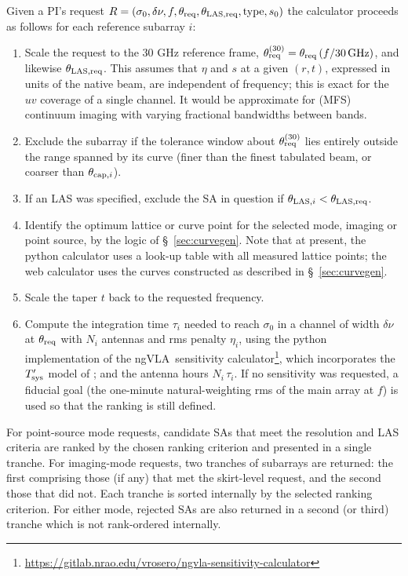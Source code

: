 \documentclass[11pt]{article}
\newcommand{\ngvla}{ngVLA}
\begin{document}
Given a PI's request $R = (\sigma_0, \delta\nu, f, \theta_{\rm req},
\theta_{\rm LAS,req}, {\rm type}, s_0)$ the calculator proceeds as
follows for each reference subarray $i$:
\begin{enumerate}
\item Scale the request to the 30 GHz reference frame, $\theta_{\rm
  req}^{(30)} = \theta_{\rm req}\,(f/30\,{\rm GHz})$, and likewise
  $\theta_{\rm LAS,req}$.  This assumes that $\eta$ and $s$ at a given
  $(r,t)$, expressed in units of the native beam, are independent of
  frequency; this is exact for the $uv$ coverage of a single channel.
  It would be approximate for (MFS) continuum imaging with varying
  fractional bandwidths between bands.
\item Exclude the subarray if the tolerance window about
  $\theta_{\rm req}^{(30)}$ lies entirely outside the range spanned by
  its curve (finer than the finest tabulated beam, or coarser than
  $\theta_{{\rm cap},i}$).
\item If an LAS was specified, exclude the SA in question if
  $\theta_{{\rm  LAS},i} < \theta_{\rm LAS,req}$.
\item Identify the optimum lattice or curve point for the selected
  mode, imaging or point source, by the logic of \S~\ref{sec:curvegen}.
  Note that at present, the python calculator uses a look-up table
  with all measured lattice points; the web calculator uses the
  curves constructed as described in \S~\ref{sec:curvegen}.
\item Scale the taper $t$ back to the requested frequency.
\item Compute the integration time $\tau_i$ needed to reach $\sigma_0$
  in a channel of width $\delta\nu$ at $\theta_{\rm req}$ with $N_i$
  antennas and rms penalty $\eta_i$, using the python implementation
  of the \ngvla\ sensitivity
  calculator\footnote{\url{https://gitlab.nrao.edu/vrosero/ngvla-sensitivity-calculator}},
  which incorporates the $T'_{\rm sys}$ model of \citep{memo96}; and
  the antenna hours $N_i\,\tau_i$.  If no sensitivity was requested, a
  fiducial goal (the one-minute natural-weighting rms of the main
  array at $f$) is used so that the ranking is still defined.
\end{enumerate}

For point-source mode requests, candidate SAs that meet the resolution
and LAS criteria are ranked by the chosen ranking criterion and
presented in a single tranche.  For imaging-mode requests, two
tranches of subarrays are returned: the first comprising those (if
any) that met the skirt-level request, and the second those that did
not. Each tranche is sorted internally by the selected ranking
criterion. For either mode, rejected SAs are also returned in a second
(or third) tranche which is not rank-ordered internally.
\end{document}
